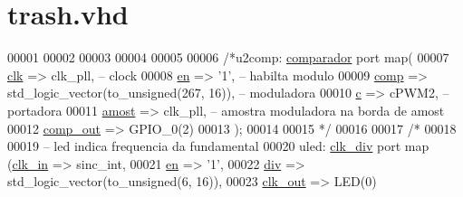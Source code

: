 \hypertarget{trash_8vhd_source}{}\section{trash.\+vhd}

\begin{DoxyCode}
00001 
00002 
00003     
00004             
00005             
00006  \textcolor{vhdlchar}{/}\textcolor{vhdlchar}{*}u2comp: \hyperlink{classcomparador}{comparador} \textcolor{keywordflow}{port} \textcolor{keywordflow}{map}(
00007             \hyperlink{classcomparador_a4a4609c199d30b3adebbeb3a01276ec5}{clk} => clk\_pll,\textcolor{keyword}{ -- clock}
00008             \hyperlink{classcomparador_adcf9c6f5161d039addbda5819bee64a3}{en} => '1',\textcolor{keyword}{ -- habilta modulo}
00009             \hyperlink{classcomparador_a0c2a0581e706d5256b50516b6ca4dbed}{comp} => \textcolor{comment}{std\_logic\_vector}\textcolor{vhdlchar}{(}to\_unsigned\textcolor{vhdlchar}{(}\textcolor{vhdllogic}{267}, \textcolor{vhdllogic}{16}\textcolor{vhdlchar}{)}\textcolor{vhdlchar}{)},\textcolor{keyword}{ -- moduladora     }
00010             \hyperlink{classcomparador_a0808bf3e7965a8ee90dec6604647f179}{c} => cPWM2,\textcolor{keyword}{ -- portadora}
00011             \hyperlink{classcomparador_af9b8278b961604ab62a822537a109adb}{amost} => clk\_pll,\textcolor{keyword}{ -- amostra moduladora na borda de amost}
00012            \hyperlink{classcomparador_a2522d63dc2aa0652b3cca6ac9b1da0bd}{comp\_out} => GPIO\_0\textcolor{vhdlchar}{(}\textcolor{vhdllogic}{2}\textcolor{vhdlchar}{)}
00013             \textcolor{vhdlchar}{)};
00014         
00015     \textcolor{vhdlchar}{*}\textcolor{vhdlchar}{/}
00016 
00017 \textcolor{vhdlchar}{/}\textcolor{vhdlchar}{*}  
00018                     
00019 \textcolor{keyword}{    --  led indica frequencia da fundamental                }
00020     uled: \hyperlink{classclk__div}{clk\_div} \textcolor{keywordflow}{port} \textcolor{keywordflow}{map} (\hyperlink{classclk__div_a57fad7f33f7766724bdea76e7b0330ef}{clk\_in} => sinc\_int,
00021                                 \hyperlink{classclk__div_a512588aa484615b7e90600a1bc9507b4}{en} => '1',
00022                                 \hyperlink{classclk__div_a425c2042b3ea21827b9b29c6712312d9}{div} => \textcolor{comment}{std\_logic\_vector}\textcolor{vhdlchar}{(}to\_unsigned\textcolor{vhdlchar}{(}\textcolor{vhdllogic}{6}, \textcolor{vhdllogic}{16}\textcolor{vhdlchar}{)}\textcolor{vhdlchar}{)},
00023                         \hyperlink{classclk__div_a8147ca5cedee84ed9753ac6f1f0b2374}{clk\_out} => LED\textcolor{vhdlchar}{(}\textcolor{vhdllogic}{0}\textcolor{vhdlchar}{)}

\end{DoxyCode}

